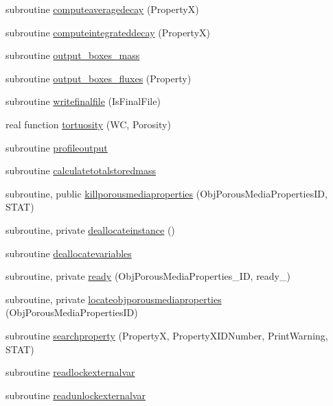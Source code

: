 \begin{DoxyCompactItemize}
\item 
subroutine \mbox{\hyperlink{namespacemoduleporousmediaproperties_a3d3bfa08325114d10c44b11e29d42d78}{computeaveragedecay}} (PropertyX)
\item 
subroutine \mbox{\hyperlink{namespacemoduleporousmediaproperties_a06f48331cb6d7a1d7fa1520565129efc}{computeintegrateddecay}} (PropertyX)
\item 
subroutine \mbox{\hyperlink{namespacemoduleporousmediaproperties_a4763c798964b2cbb6e1e012ba2141ff8}{output\+\_\+boxes\+\_\+mass}}
\item 
subroutine \mbox{\hyperlink{namespacemoduleporousmediaproperties_a7485615a66ceb16b22cd17c505c048ff}{output\+\_\+boxes\+\_\+fluxes}} (Property)
\item 
subroutine \mbox{\hyperlink{namespacemoduleporousmediaproperties_aed2bfb3c9121c8c37fc6bcd2ac8e1eb0}{writefinalfile}} (Is\+Final\+File)
\item 
real function \mbox{\hyperlink{namespacemoduleporousmediaproperties_ad5b352d84190c0b9d6cebc1a83db8ded}{tortuosity}} (WC, Porosity)
\item 
subroutine \mbox{\hyperlink{namespacemoduleporousmediaproperties_a223a0c32882543deab6de89c82e4295c}{profileoutput}}
\item 
subroutine \mbox{\hyperlink{namespacemoduleporousmediaproperties_a39cd5689166d641ddb0f961d291c6061}{calculatetotalstoredmass}}
\item 
subroutine, public \mbox{\hyperlink{namespacemoduleporousmediaproperties_a735090aa674c6c295828243dcd120d40}{killporousmediaproperties}} (Obj\+Porous\+Media\+Properties\+ID, S\+T\+AT)
\item 
subroutine, private \mbox{\hyperlink{namespacemoduleporousmediaproperties_a7002642c0fa8ff01f584386876557fef}{deallocateinstance}} ()
\item 
subroutine \mbox{\hyperlink{namespacemoduleporousmediaproperties_a03075fd748d4630c43019d9d8b5c9b79}{deallocatevariables}}
\item 
subroutine, private \mbox{\hyperlink{namespacemoduleporousmediaproperties_a1a2026bd74e611727f9dca5173548d05}{ready}} (Obj\+Porous\+Media\+Properties\+\_\+\+ID, ready\+\_\+)
\item 
subroutine, private \mbox{\hyperlink{namespacemoduleporousmediaproperties_a69bcc7ae1a4b78b640c2d9f0d660587f}{locateobjporousmediaproperties}} (Obj\+Porous\+Media\+Properties\+ID)
\item 
subroutine \mbox{\hyperlink{namespacemoduleporousmediaproperties_af651cef8320f1769d6f02a15144aae88}{searchproperty}} (PropertyX, Property\+X\+I\+D\+Number, Print\+Warning, S\+T\+AT)
\item 
subroutine \mbox{\hyperlink{namespacemoduleporousmediaproperties_a56260cc89bfdab790c373015aa5f4675}{readlockexternalvar}}
\item 
subroutine \mbox{\hyperlink{namespacemoduleporousmediaproperties_aa21cfad85460a30a39a9fb8f3421f874}{readunlockexternalvar}}
\end{DoxyCompactItemize}
